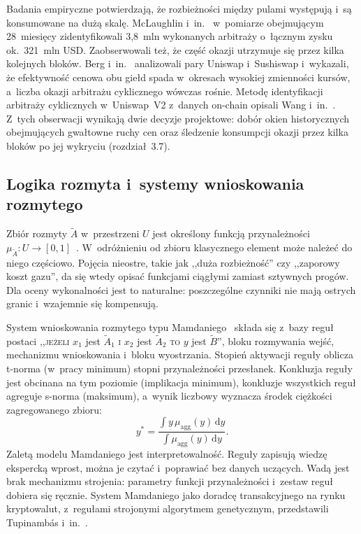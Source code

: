 Badania empiryczne potwierdzają, że rozbieżności między pulami występują i~są konsumowane na dużą
skalę. McLaughlin i~in.~\cite{mclaughlin_arbitrage} w~pomiarze obejmującym 28~miesięcy
zidentyfikowali 3{,}8~mln wykonanych arbitraży o~łącznym zysku ok.~321~mln USD. Zaobserwowali też,
że część okazji utrzymuje się przez kilka kolejnych bloków. Berg i~in.~\cite{berg_inefficiencies}
analizowali pary Uniswap i~Sushiswap i~wykazali, że efektywność cenowa obu giełd spada w~okresach
wysokiej zmienności kursów, a~liczba okazji arbitrażu cyklicznego wówczas rośnie. Metodę
identyfikacji arbitraży cyklicznych w~Uniswap~V2 z~danych on-chain opisali Wang
i~in.~\cite{wang_cyclic_arbitrage}. Z~tych obserwacji wynikają dwie decyzje projektowe: dobór okien
historycznych obejmujących gwałtowne ruchy cen oraz śledzenie konsumpcji okazji przez kilka
bloków po jej wykryciu (rozdział~3.7).

\subsection{Logika rozmyta i~systemy wnioskowania rozmytego}

Zbiór rozmyty $\tilde{A}$ w~przestrzeni $U$ jest określony funkcją przynależności
$\mu_{\tilde A}\colon U \to [0,1]$~\cite{zadeh1965}. W~odróżnieniu od zbioru klasycznego element
może należeć do niego częściowo. Pojęcia nieostre, takie jak ,,duża rozbieżność'' czy ,,zaporowy
koszt gazu'', da się wtedy opisać funkcjami ciągłymi zamiast sztywnych progów. Dla oceny
wykonalności jest to naturalne: poszczególne czynniki nie mają ostrych granic i~wzajemnie się
kompensują.

System wnioskowania rozmytego typu Mamdaniego~\cite{mamdani1975} składa się z~bazy reguł postaci
,,\textsc{jeżeli} $x_1$ jest $\tilde A_1$ \textsc{i} $x_2$ jest $\tilde A_2$ \textsc{to} $y$ jest
$\tilde B$'', bloku rozmywania wejść, mechanizmu wnioskowania i~bloku wyostrzania. Stopień
aktywacji reguły oblicza t-norma (w~pracy minimum) stopni przynależności przesłanek. Konkluzja
reguły jest obcinana na tym poziomie (implikacja minimum), konkluzje wszystkich reguł agreguje
s-norma (maksimum), a~wynik liczbowy wyznacza środek ciężkości zagregowanego zbioru:
\begin{equation}
  y^{*} = \frac{\int y\, \mu_{\mathrm{agg}}(y)\, \mathrm{d}y}{\int \mu_{\mathrm{agg}}(y)\, \mathrm{d}y}.
  \label{eq:centroid}
\end{equation}
Zaletą modelu Mamdaniego jest interpretowalność. Reguły zapisują wiedzę ekspercką wprost, można
je czytać i~poprawiać bez danych uczących. Wadą jest brak mechanizmu strojenia: parametry funkcji
przynależności i~zestaw reguł dobiera się ręcznie. System Mamdaniego jako doradcę transakcyjnego
na rynku kryptowalut, z~regułami strojonymi algorytmem genetycznym, przedstawili Tupinambás
i~in.~\cite{tupinambas_fuzzy_crypto}.


